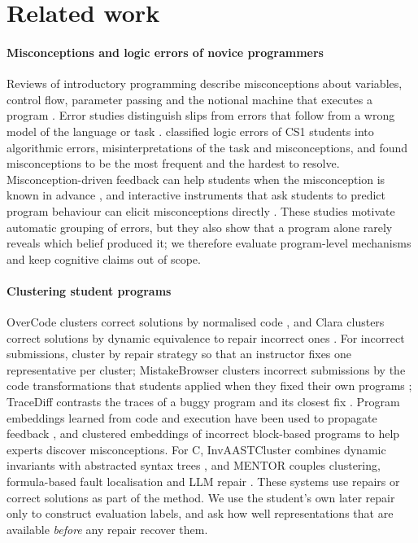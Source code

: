 \documentclass[a4paper,preprint,12pt,authoryear]{elsarticle}
\begin{document}
\section{Related work}\label{sec:related}

\paragraph{Misconceptions and logic errors of novice programmers}
Reviews of introductory programming describe misconceptions about variables, control flow, parameter passing and the notional machine that executes a program \citep{sorva2013notional,qian2017misconceptions}. Error studies distinguish slips from errors that follow from a wrong model of the language or task \citep{altadmri2015compilations,hermans2021brain}. \citet{ettles2018logic} classified logic errors of CS1 students into algorithmic errors, misinterpretations of the task and misconceptions, and found misconceptions to be the most frequent and the hardest to resolve. Misconception-driven feedback can help students when the misconception is known in advance \citep{gusukuma2018misconception}, and interactive instruments that ask students to predict program behaviour can elicit misconceptions directly \citep{lu2024smol}. These studies motivate automatic grouping of errors, but they also show that a program alone rarely reveals which belief produced it; we therefore evaluate program-level mechanisms and keep cognitive claims out of scope.

\paragraph{Clustering student programs}
OverCode clusters correct solutions by normalised code \citep{glassman2015overcode}, and Clara clusters correct solutions by dynamic equivalence to repair incorrect ones \citep{gulwani2018clara}. For incorrect submissions, \citet{kaleeswaran2016semisupervised} cluster by repair strategy so that an instructor fixes one representative per cluster; MistakeBrowser clusters incorrect submissions by the code transformations that students applied when they fixed their own programs \citep{head2017mistakebrowser}; TraceDiff contrasts the traces of a buggy program and its closest fix \citep{suzuki2017tracediff}. Program embeddings learned from code and execution have been used to propagate feedback \citep{piech2015embeddings}, and \citet{shi2021misconception} clustered embeddings of incorrect block-based programs to help experts discover misconceptions. For C, InvAASTCluster combines dynamic invariants with abstracted syntax trees \citep{orvalho2025invaast}, and MENTOR couples clustering, formula-based fault localisation and LLM repair \citep{orvalho2026mentor}. These systems use repairs or correct solutions as part of the method. We use the student's own later repair only to construct evaluation labels, and ask how well representations that are available \emph{before} any repair recover them.
\end{document}
